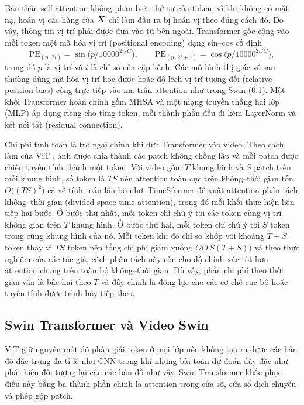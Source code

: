 Bản thân self-attention không phân biệt thứ tự của token, vì khi không có mặt nạ, hoán vị các hàng của $\bm{X}$ chỉ làm đầu ra bị hoán vị theo đúng cách đó. Do vậy, thông tin vị trí phải được đưa vào từ bên ngoài. Transformer gốc \cite{vaswani2017attention} cộng vào mỗi token một mã hóa vị trí (positional encoding) dạng sin--cos cố định
\begin{equation}
\mathrm{PE}_{(p,\,2i)} = \sin\!\big(p / 10000^{2i/C}\big), \qquad
\mathrm{PE}_{(p,\,2i+1)} = \cos\!\big(p / 10000^{2i/C}\big),
\label{eq:posenc}
\end{equation}
trong đó $p$ là vị trí và $i$ là chỉ số của cặp kênh. Các mô hình thị giác về sau thường dùng mã hóa vị trí học được hoặc độ lệch vị trí tương đối (relative position bias) cộng trực tiếp vào ma trận attention như trong Swin (\cref{sec:swin}). Một khối Transformer hoàn chỉnh gồm MHSA và một mạng truyền thẳng hai lớp (MLP) áp dụng riêng cho từng token, mỗi thành phần đều đi kèm LayerNorm và kết nối tắt (residual connection).

Chi phí tính toán là trở ngại chính khi đưa Transformer vào video. Theo cách làm của ViT \cite{dosovitskiy2021vit}, ảnh được chia thành các patch không chồng lấp và mỗi patch được chiếu tuyến tính thành một token. Với video gồm $T$ khung hình và $S$ patch trên mỗi khung hình, số token là $TS$ nên attention toàn cục trên không--thời gian tốn $O\big((TS)^2\big)$ cả về tính toán lẫn bộ nhớ. TimeSformer \cite{bertasius2021timesformer} đề xuất attention phân tách không--thời gian (divided space-time attention), trong đó mỗi khối thực hiện liên tiếp hai bước. Ở bước thứ nhất, mỗi token chỉ chú ý tới các token cùng vị trí không gian trên $T$ khung hình. Ở bước thứ hai, mỗi token chỉ chú ý tới $S$ token trong cùng khung hình của nó. Mỗi token khi đó chỉ so khớp với khoảng $T + S$ token thay vì $TS$ token nên tổng chi phí giảm xuống $O\big(TS(T + S)\big)$ và theo thực nghiệm của các tác giả, cách phân tách này còn cho độ chính xác tốt hơn attention chung trên toàn bộ không--thời gian. Dù vậy, phần chi phí theo thời gian vẫn là bậc hai theo $T$ và đây chính là động lực cho các cơ chế cục bộ hoặc tuyến tính được trình bày tiếp theo.

\subsection{Swin Transformer và Video Swin}
\label{sec:swin}

ViT giữ nguyên một độ phân giải token ở mọi lớp nên không tạo ra được các bản đồ đặc trưng đa tỉ lệ như CNN trong khi những bài toán dự đoán dày đặc như phát hiện đối tượng lại cần các bản đồ như vậy. Swin Transformer \cite{liu2021swin} khắc phục điều này bằng ba thành phần chính là attention trong cửa sổ, cửa sổ dịch chuyển và phép gộp patch.

